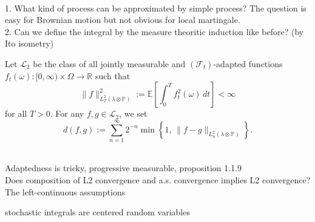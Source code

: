 \quad\\
1. What kind of process can be approximated by simple process? 
The question is easy for Brownian motion but not obvious for local martingale. \\
2. Can we define the integral by the measure theoritic induction like before? (by Ito isometry)

\begin{definition}[$\mathcal{L}_2$]
	Let $\mathcal{L}_2$ be the class of all jointly measurable and $(\mathcal{F}_t)$-adapted functions $f_t(\omega) : [0,\infty) \times \Omega \to \mathbb{R}$ such that
	\begin{equation*}
		\|f\|^2_{L^2_T(\lambda \otimes \mathbb{P})} := \mathbb{E}\left[\int_0^T f_t^2(\omega)\, dt\right] < \infty
	\end{equation*}
	for all $T > 0$. For any $f, g \in \mathcal{L}_2$, we set
	\begin{equation*}
		d(f,g) := \sum_{n=1}^{\infty} 2^{-n} \min\!\left\{1,\, \|f - g\|_{L^2_n(\lambda \otimes \mathbb{P})}\right\}.
	\end{equation*}
\end{definition}

\quad\\
Adaptedness is tricky, progressive measurable, proposition 1.1.9\\
Does composition of L2 convergence and a.s. convergence implies L2 convergence?\\
The left-continuous assumptions

stochastic integrals are centered random variables
